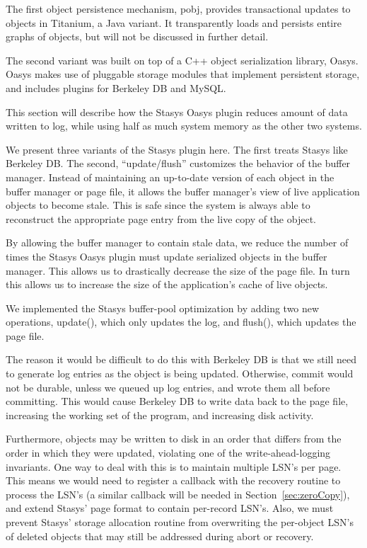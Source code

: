 \documentclass[letterpaper,twocolumn,10pt]{article}
\newcommand{\yad}{Stasys\xspace}
\newcommand{\yads}{Stasys'\xspace}
\newcommand{\oasys}{Oasys\xspace}
\begin{document}
The first object persistence mechanism, pobj, provides transactional updates to objects in
Titanium, a Java variant.  It transparently loads and persists
entire graphs of objects, but will not be discussed in further detail.

The second variant was built on top of a C++ object
serialization library, \oasys.  \oasys makes use of pluggable storage
modules that implement persistent storage, and includes plugins
for Berkeley DB and MySQL.  

This section will describe how the \yad
\oasys plugin reduces amount of data written to log, while using half as much system
memory as the other two systems.

We present three variants of the \yad plugin here.  The first treats \yad like
Berkeley DB.  The second, ``update/flush'' customizes the behavior of the buffer
manager.  Instead of maintaining an up-to-date version of each object
in the buffer manager or page file, it allows the buffer manager's
view of live application objects to become stale.  This is safe since
the system is always able to reconstruct the appropriate page entry
from the live copy of the object.

By allowing the buffer manager to contain stale data, we reduce the
number of times the \yad \oasys plugin must update serialized objects in the buffer manager.
This allows us to drastically decrease the
size of the page file.  In turn this allows us to increase the size of
the application's cache of live objects.

We implemented the \yad buffer-pool optimization by adding two new
operations, update(), which only updates the log, and flush(), which
updates the page file.  

The reason it would be difficult to do this with Berkeley DB is that
we still need to generate log entries as the object is being updated.
Otherwise, commit would not be durable, unless we queued up log 
entries, and wrote them all before committing.  
  This would cause Berkeley DB to write data back to the
page file, increasing the working set of the program, and increasing
disk activity.

Furthermore, objects may be written to disk in an
order that differs from the order in which they were updated, 
violating one of the write-ahead-logging invariants.  One way to 
deal with this is to maintain multiple LSN's per page.  This means we would need to register a
callback with the recovery routine to process the LSN's (a similar
callback will be needed in Section~\ref{sec:zeroCopy}), and 
extend \yads page format to contain per-record LSN's.  
Also, we must prevent \yads storage allocation routine from overwriting the per-object 
LSN's of deleted objects that may still be addressed during abort or recovery.  
\end{document}
